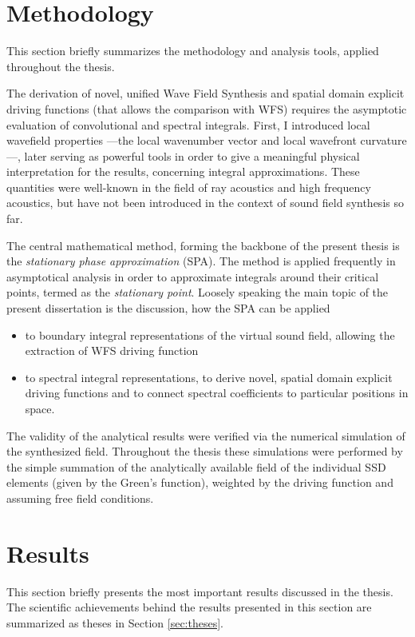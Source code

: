 \documentclass[10pt,twoside]{article}
\theoremstyle{thesisgroupstyle}
\theoremstyle{indented}
\begin{document}
\section{Methodology}

This section briefly summarizes the methodology and analysis tools, applied throughout the thesis.

The derivation of novel, unified Wave Field Synthesis and spatial domain explicit driving functions (that allows the comparison with WFS) requires the asymptotic evaluation of convolutional and spectral integrals.
First, I introduced local wavefield properties ---the local wavenumber vector and local wavefront curvature---, later serving as powerful tools in order to give a meaningful physical interpretation for the results, concerning integral approximations.
These quantities were well-known in the field of ray acoustics and high frequency acoustics, but have not been introduced in the context of sound field synthesis so far.

The central mathematical method, forming the backbone of the present thesis is the \emph{stationary phase approximation} (SPA). 
The method is applied frequently in asymptotical analysis in order to approximate integrals around their critical points, termed as the \emph{stationary point}.
Loosely speaking the main topic of the present dissertation is the discussion, how the SPA can be applied 
\begin{itemize}
\item to boundary integral representations of the virtual sound field, allowing the extraction of WFS driving function 
\item to spectral integral representations, to derive novel, spatial domain explicit driving functions and to connect spectral coefficients to particular positions in space.
\end{itemize}
The validity of the analytical results were verified via the numerical simulation of the synthesized field.
Throughout the thesis these simulations were performed by the simple summation of the analytically available field of the individual SSD elements (given by the Green's function), weighted by the driving function and assuming free field conditions.

\section{Results}
This section briefly presents the most important results discussed in the thesis. 
The scientific achievements behind the results presented in this section are summarized as theses in Section \ref{sec:theses}.
\end{document}
